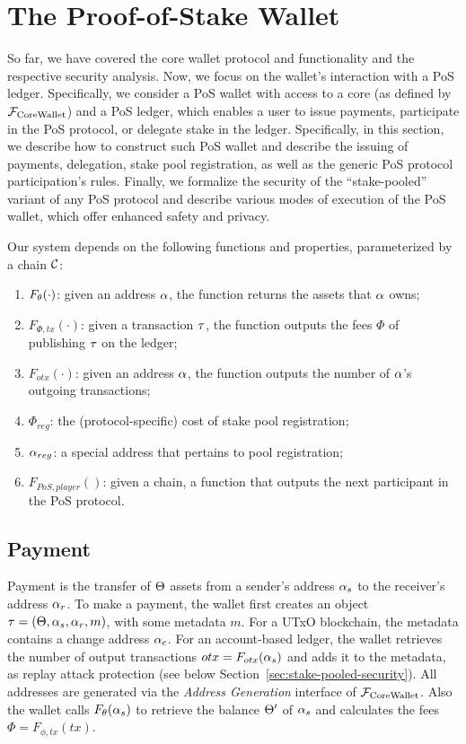 \section{The Proof-of-Stake Wallet}\label{sec:delegation-transaction}

So far, we have covered the core wallet protocol and functionality and the
respective security analysis. Now, we focus on the wallet's interaction with a
PoS ledger. Specifically, we consider a PoS wallet with access to a core (as
defined by $\mathcal{F}_\mathrm{CoreWallet}$) and a PoS ledger, which enables a user to issue payments,
participate in the PoS protocol, or delegate stake in the ledger. Specifically,
in this section, we describe how to construct such PoS wallet and describe the
issuing of payments, delegation, stake pool registration, as well as the
generic PoS protocol participation's rules. Finally, we formalize the security
of the ``stake-pooled'' variant of any PoS protocol and describe various modes
of execution of the PoS wallet, which offer enhanced safety and privacy.

Our system depends on the following functions and properties, parameterized by
a chain $\mathcal{C}$:
\begin{enumerate}
    \item $F_\theta(\cdot)$: given an address $\alpha$, the function returns the
        assets that $\alpha$ owns;
    \item $F_{\Phi, tx}(\cdot)$: given a transaction $\tau$, the function
        outputs the fees $\Phi$ of publishing $\tau$ on the ledger;
    \item $F_{otx}(\cdot)$: given an address $\alpha$, the function outputs the
        number of $\alpha$'s outgoing transactions;
    \item $\Phi_{reg}$: the (protocol-specific) cost of stake pool
        registration;
    \item $\alpha_{reg}$: a special address that pertains to pool registration;
    \item $F_{PoS, player}()$: given a chain, a function that outputs the next
        participant in the PoS protocol.
\end{enumerate}

\subsection{Payment}\label{subsec:payment}

Payment is the transfer of $\Theta$ assets from a sender's address $\alpha_s$
to the receiver's address $\alpha_r$. To make a payment, the wallet first
creates an object $\tau = (\Theta, \alpha_s, \alpha_r, m)$, with some metadata
$m$.  For a UTxO blockchain, the metadata contains a change address $\alpha_c$.
For an account-based ledger, the wallet retrieves the number of output
transactions $otx = F_{otx}(\alpha_s)$ and adds it to the metadata, as replay
attack protection (see below Section~\ref{sec:stake-pooled-security}). All
addresses are generated via the \emph{Address Generation} interface of
$\mathcal{F}_\mathrm{CoreWallet}$. Also the wallet calls $F_\theta(\alpha_s)$ to retrieve the balance
$\Theta^\prime$ of $\alpha_s$ and calculates the fees $\Phi = F_{\phi,
tx}(tx)$.

